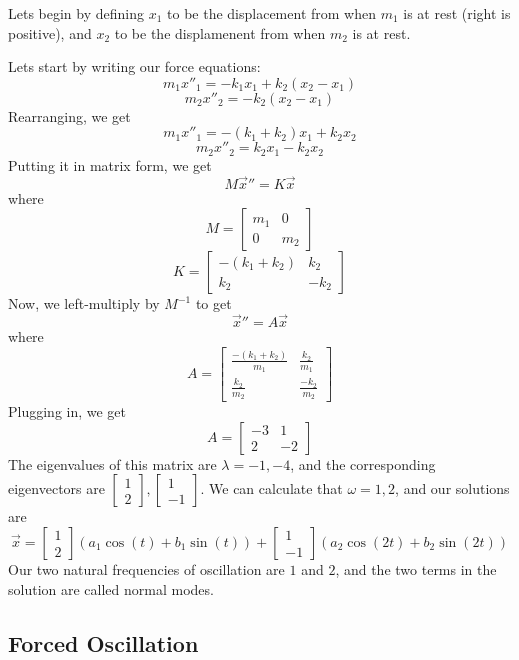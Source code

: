 \documentclass{article}
\begin{document}
\begin{solution}
Lets begin by defining $x_1$ to be the displacement from when $m_1$ is at rest (right is positive), and $x_2$ to be the displamenent from when $m_2$ is at rest.

Lets start by writing our force equations: $$m_1x''_1 = -k_1x_1 + k_2(x_2-x_1)$$$$m_2x''_2 = -k_2(x_2-x_1)$$Rearranging, we get $$m_1x''_1 = -(k_1+k_2)x_1 + k_2x_2$$ $$m_2x''_2 = k_2x_1-k_2x_2$$Putting it in matrix form, we get $$M\vec{x}'' = K\vec{x}$$where$$M = \begin{bmatrix}
    m_1 & 0 \\ 0 & m_2
\end{bmatrix}$$$$K = \begin{bmatrix}
    -(k_1+k_2) & k_2\\k_2 & -k_2
\end{bmatrix}$$Now, we left-multiply by $M ^{-1}$ to get $$\vec{x}'' = A\vec{x}$$where$$A = \begin{bmatrix}
    \frac{-(k_1+k_2)}{m_1} & \frac{k_2}{m_1} \\ \frac{k_2}{m_2} & \frac{-k_2}{m_2}
\end{bmatrix}$$Plugging in, we get $$A = \begin{bmatrix}
    -3 & 1 \\ 2 & -2
\end{bmatrix}$$The eigenvalues of this matrix are $\lambda = -1, -4$, and the corresponding eigenvectors are $\begin{bmatrix}
    1\\2
\end{bmatrix}, \begin{bmatrix}
    1 \\ -1
\end{bmatrix}$. We can calculate that $\omega = 1, 2$, and our solutions are $$\vec{x} = \begin{bmatrix}
    1\\2
\end{bmatrix}(a_1\cos(t) + b_1\sin(t)) + \begin{bmatrix}
    1\\-1
\end{bmatrix}(a_2\cos(2t) + b_2\sin(2t))$$Our two natural frequencies of oscillation are $1$ and $2$, and the two terms in the solution are called normal modes. 
\end{solution}

\subsection{Forced Oscillation}
\end{document}
